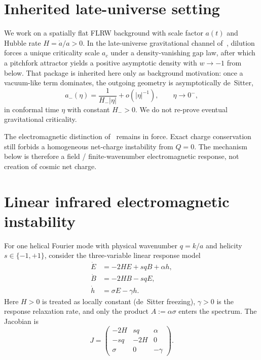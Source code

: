 \documentclass[11pt]{article}
\theoremstyle{definition}
\theoremstyle{remark}
\begin{document}
\section{Inherited late-universe setting}
\label{sec:inherited}
We work on a spatially flat FLRW background with scale factor $a(t)$ and Hubble rate
$H=\dot a/a>0$.
In the late-universe gravitational channel of~\cite{boyd2026late}, dilution forces a unique
criticality scale $a_c$ under a density-vanishing gap law, after which a pitchfork attractor
yields a positive asymptotic density with $w\to-1$ from below.
That package is inherited here only as background motivation: once a vacuum-like term
dominates, the outgoing geometry is asymptotically de~Sitter,
\begin{equation}
\label{eq:dS}
a_-(\eta)=\frac{1}{H_-|\eta|}+o(|\eta|^{-1}),
\qquad \eta\to 0^-,
\end{equation}
in conformal time $\eta$ with constant $H_->0$.
We do not re-prove eventual gravitational criticality.

The electromagnetic distinction of~\cite{boyd2026late} remains in force.
Exact charge conservation still forbids a homogeneous net-charge instability from $Q=0$.
The mechanism below is therefore a field / finite-wavenumber electromagnetic response, not
creation of cosmic net charge.

\section{Linear infrared electromagnetic instability}
\label{sec:linear}
For one helical Fourier mode with physical wavenumber $q=k/a$ and helicity
$s\in\{-1,+1\}$, consider the three-variable linear response model
\begin{align}
\label{eq:linEM}
\dot E &= -2HE + s q B + \alpha h,\\
\dot B &= -2HB - s q E,\\
\dot h &= \sigma E - \gamma h.
\end{align}
Here $H>0$ is treated as locally constant (de~Sitter freezing), $\gamma>0$ is the response
relaxation rate, and only the product $A:=\alpha\sigma$ enters the spectrum.
The Jacobian is
\begin{equation}
\label{eq:J}
J=\begin{pmatrix}-2H&sq&\alpha\\-sq&-2H&0\\\sigma&0&-\gamma\end{pmatrix}.
\end{equation}
\end{document}
